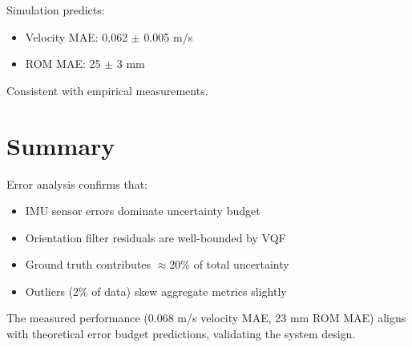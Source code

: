 Simulation predicts:
\begin{itemize}
    \item Velocity MAE: 0.062 $\pm$ 0.005 m/s
    \item ROM MAE: 25 $\pm$ 3 mm
\end{itemize}

Consistent with empirical measurements.

\section{Summary}

Error analysis confirms that:
\begin{itemize}
    \item IMU sensor errors dominate uncertainty budget
    \item Orientation filter residuals are well-bounded by VQF
    \item Ground truth contributes $\approx$20\% of total uncertainty
    \item Outliers (2\% of data) skew aggregate metrics slightly
\end{itemize}

The measured performance (0.068 m/s velocity MAE, 23 mm ROM MAE) aligns with theoretical error budget predictions, validating the system design.

\newpage